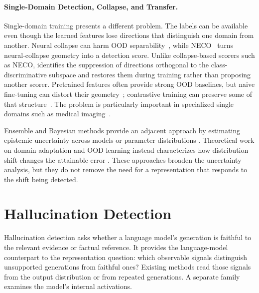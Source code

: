 \paragraph{Single-Domain Detection, Collapse, and Transfer.}
Single-domain training presents a different problem. The labels can be available
even though the learned features lose directions that distinguish one domain from
another. Neural collapse can harm OOD separability~\citep{Haas2022ncood}, while
NECO~\citep{BenAmmar2024neco} turns neural-collapse geometry into a detection
score. Unlike collapse-based scorers such as NECO,
 identifies the suppression of directions
orthogonal to the class-discriminative subspace and restores them during training
rather than proposing another scorer. Pretrained features often provide strong OOD
baselines, but naive fine-tuning can distort their geometry~\citep{Kumar2022lp};
contrastive training can preserve some of that structure~\citep{Winkens2020contrastive}.
The problem is particularly important in specialized single domains such as medical
imaging~\citep{Berger2021medood,zhou2022rethinking}.

Ensemble and Bayesian methods provide an adjacent approach by estimating epistemic
uncertainty across models or parameter distributions
\citep{lakshminarayanan2017simple,daxberger2019bayesian,pmlr-v235-xu24ae}.
Theoretical work on domain adaptation and OOD learning instead characterizes how
distribution shift changes the attainable error
\citep{ben2010theory,vyas2018out,katz2022training}. These approaches broaden the
uncertainty analysis, but they do not remove the need for a representation that
responds to the shift being detected.

\section{Hallucination Detection}
\label{sec:lit:hallucination}

Hallucination detection asks whether a language model's generation is faithful to
the relevant evidence or factual reference. It provides the language-model
counterpart to the representation question: which observable signals distinguish
unsupported generations from faithful ones? Existing methods read those signals
from the output distribution or from repeated generations. A separate family
examines the model's internal activations.

